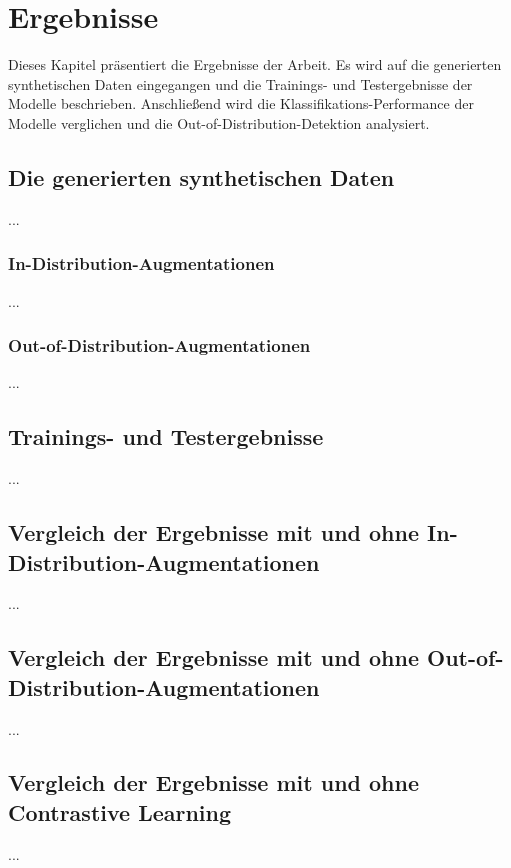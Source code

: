 \chapter{Ergebnisse}

Dieses Kapitel präsentiert die Ergebnisse der Arbeit. Es wird auf die generierten synthetischen Daten eingegangen und die Trainings- und Testergebnisse der Modelle beschrieben. Anschließend wird die Klassifikations-Performance der Modelle verglichen und die Out-of-Distribution-Detektion analysiert.

\section{Die generierten synthetischen Daten}


...

\subsection{In-Distribution-Augmentationen}


...

\subsection{Out-of-Distribution-Augmentationen}


...

\section{Trainings- und Testergebnisse}


...

\section{Vergleich der Ergebnisse mit und ohne In-Distribution-Augmentationen}

...

\section{Vergleich der Ergebnisse mit und ohne Out-of-Distribution-Augmentationen}

...

\section{Vergleich der Ergebnisse mit und ohne Contrastive Learning}

...